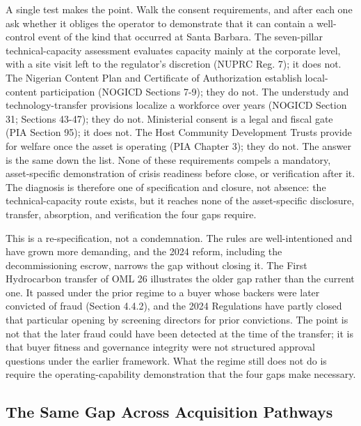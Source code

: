 A single test makes the point. Walk the consent requirements, and after
each one ask whether it obliges the operator to demonstrate that it can
contain a well-control event of the kind that occurred at Santa Barbara.
The seven-pillar technical-capacity assessment evaluates capacity mainly
at the corporate level, with a site visit left to the regulator's
discretion (NUPRC Reg. 7); it does not. The Nigerian Content Plan and
Certificate of Authorization establish local-content participation
(NOGICD Sections 7-9); they do not. The understudy and
technology-transfer provisions localize a workforce over years (NOGICD
Section 31; Sections 43-47); they do not. Ministerial consent is a legal
and fiscal gate (PIA Section 95); it does not. The Host Community
Development Trusts provide for welfare once the asset is operating (PIA
Chapter 3); they do not. The answer is the same down the list. None of
these requirements compels a mandatory, asset-specific demonstration of
crisis readiness before close, or verification after it. The diagnosis
is therefore one of specification and closure, not absence: the
technical-capacity route exists, but it reaches none of the
asset-specific disclosure, transfer, absorption, and verification the
four gaps require.

This is a re-specification, not a condemnation. The rules are
well-intentioned and have grown more demanding, and the 2024 reform,
including the decommissioning escrow, narrows the gap without closing
it. The First Hydrocarbon transfer of OML 26 illustrates the older gap
rather than the current one. It passed under the prior regime to a buyer
whose backers were later convicted of fraud (Section 4.4.2), and the
2024 Regulations have partly closed that particular opening by screening
directors for prior convictions. The point is not that the later fraud
could have been detected at the time of the transfer; it is that buyer
fitness and governance integrity were not structured approval questions
under the earlier framework. What the regime still does not do is
require the operating-capability demonstration that the four gaps make
necessary.

\hypertarget{the-same-gap-across-acquisition-pathways}{%
\subsection{The Same Gap Across Acquisition
Pathways}\label{the-same-gap-across-acquisition-pathways}}

